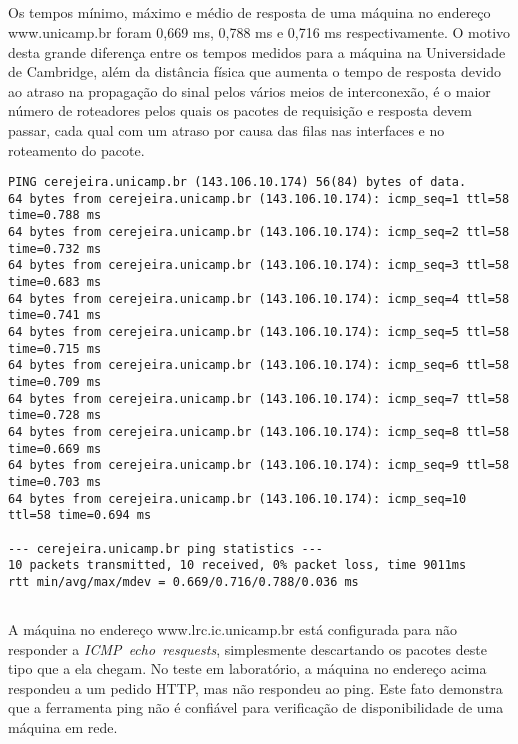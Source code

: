 \documentclass[a4paper,10pt,oneside,final,titlepage,onecolumn]{article}
\begin{document}
\subsection{}
\paragraph{}Os tempos mínimo, máximo e médio de resposta de uma máquina no endereço \mbox{www.unicamp.br} foram 0,669 ms, 0,788 ms e 0,716 ms respectivamente. O motivo desta grande diferença entre os tempos medidos para a máquina na Universidade de Cambridge, além da distância física que aumenta o tempo de resposta devido ao atraso na propagação do sinal pelos vários meios de interconexão, é o maior número de roteadores pelos quais os pacotes de requisição e resposta devem passar, cada qual com um atraso por causa das filas nas interfaces e no roteamento do pacote.
\begin{lstlisting}
PING cerejeira.unicamp.br (143.106.10.174) 56(84) bytes of data.
64 bytes from cerejeira.unicamp.br (143.106.10.174): icmp_seq=1 ttl=58 time=0.788 ms
64 bytes from cerejeira.unicamp.br (143.106.10.174): icmp_seq=2 ttl=58 time=0.732 ms
64 bytes from cerejeira.unicamp.br (143.106.10.174): icmp_seq=3 ttl=58 time=0.683 ms
64 bytes from cerejeira.unicamp.br (143.106.10.174): icmp_seq=4 ttl=58 time=0.741 ms
64 bytes from cerejeira.unicamp.br (143.106.10.174): icmp_seq=5 ttl=58 time=0.715 ms
64 bytes from cerejeira.unicamp.br (143.106.10.174): icmp_seq=6 ttl=58 time=0.709 ms
64 bytes from cerejeira.unicamp.br (143.106.10.174): icmp_seq=7 ttl=58 time=0.728 ms
64 bytes from cerejeira.unicamp.br (143.106.10.174): icmp_seq=8 ttl=58 time=0.669 ms
64 bytes from cerejeira.unicamp.br (143.106.10.174): icmp_seq=9 ttl=58 time=0.703 ms
64 bytes from cerejeira.unicamp.br (143.106.10.174): icmp_seq=10 ttl=58 time=0.694 ms

--- cerejeira.unicamp.br ping statistics ---
10 packets transmitted, 10 received, 0% packet loss, time 9011ms
rtt min/avg/max/mdev = 0.669/0.716/0.788/0.036 ms
\end{lstlisting}

\subsection{}
\paragraph{}A máquina no endereço www.lrc.ic.unicamp.br está configurada para não responder a \mbox{\emph{ICMP echo resquests}}, simplesmente descartando os pacotes deste tipo que a ela chegam. No teste em laboratório, a máquina no endereço acima respondeu a um pedido HTTP, mas não respondeu ao ping. Este fato demonstra que a ferramenta ping não é confiável para verificação de disponibilidade de uma máquina em rede.
\end{document}
